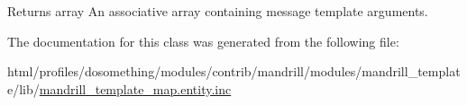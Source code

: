 \begin{DoxyReturn}{Returns}
array An associative array containing message template arguments. 
\end{DoxyReturn}


The documentation for this class was generated from the following file:\begin{DoxyCompactItemize}
\item 
html/profiles/dosomething/modules/contrib/mandrill/modules/mandrill\_\-template/lib/\hyperlink{mandrill__template__map_8entity_8inc}{mandrill\_\-template\_\-map.entity.inc}\end{DoxyCompactItemize}
